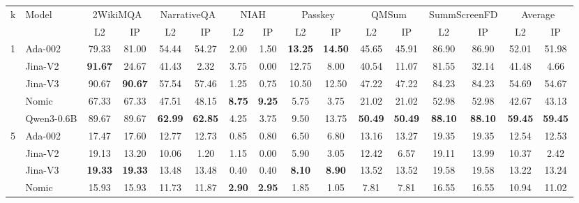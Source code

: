 \begin{sidewaystable}[htbp!]
\centering
\footnotesize
{}
\label{tab:detailed_precision}
\begin{tabular}{llcccccccccccccc}
\toprule
\multirow{2}{*}{k} & \multirow{2}{*}{Model} & \multicolumn{2}{c}{2WikiMQA} & \multicolumn{2}{c}{NarrativeQA} & \multicolumn{2}{c}{NIAH} & \multicolumn{2}{c}{Passkey} & \multicolumn{2}{c}{QMSum} & \multicolumn{2}{c}{SummScreenFD} & \multicolumn{2}{c}{Average} \\
\cmidrule(lr){3-4} \cmidrule(lr){5-6} \cmidrule(lr){7-8} \cmidrule(lr){9-10} \cmidrule(lr){11-12} \cmidrule(lr){13-14} \cmidrule(lr){15-16}
& & L2 & IP & L2 & IP & L2 & IP & L2 & IP & L2 & IP & L2 & IP & L2 & IP \\
\midrule
\multirow{5}{*}{1} & Ada-002 & 79.33 & 81.00 & 54.44 & 54.27 & 2.00 & 1.50 & \textbf{13.25} & \textbf{14.50} & 45.65 & 45.91 & 86.90 & 86.90 & 52.01 & 51.98 \\
& Jina-V2 & \textbf{91.67} & 24.67 & 41.43 & 2.32 & 3.75 & 0.00 & 12.75 & 8.00 & 40.54 & 11.07 & 81.55 & 32.14 & 41.48 & 4.66 \\
& Jina-V3 & 90.67 & \textbf{90.67} & 57.54 & 57.46 & 1.25 & 0.75 & 10.50 & 12.50 & 47.22 & 47.22 & 84.23 & 84.23 & 54.69 & 54.67 \\
& Nomic & 67.33 & 67.33 & 47.51 & 48.15 & \textbf{8.75} & \textbf{9.25} & 5.75 & 3.75 & 21.02 & 21.02 & 52.98 & 52.98 & 42.67 & 43.13 \\
& Qwen3-0.6B & 89.67 & 89.67 & \textbf{62.99} & \textbf{62.85} & 4.25 & 3.75 & 9.50 & 13.75 & \textbf{50.49} & \textbf{50.49} & \textbf{88.10} & \textbf{88.10} & \textbf{59.45} & \textbf{59.45} \\
\midrule
\multirow{5}{*}{5} & Ada-002 & 17.47 & 17.60 & 12.77 & 12.73 & 0.85 & 0.80 & 6.50 & 6.80 & 13.16 & 13.27 & 19.35 & 19.35 & 12.54 & 12.53 \\
& Jina-V2 & 19.13 & 13.20 & 10.06 & 1.20 & 1.15 & 0.00 & 5.90 & 3.05 & 12.42 & 6.57 & 19.11 & 13.99 & 10.37 & 2.42 \\
& Jina-V3 & \textbf{19.33} & \textbf{19.33} & 13.48 & 13.48 & 0.40 & 0.40 & \textbf{8.10} & \textbf{8.90} & 13.52 & 13.52 & 19.58 & 19.58 & 13.22 & 13.24 \\
& Nomic & 15.93 & 15.93 & 11.73 & 11.87 & \textbf{2.90} & \textbf{2.95} & 1.85 & 1.05 & 7.81 & 7.81 & 16.55 & 16.55 & 10.94 & 11.02 \\

\end{tabular}
\end{sidewaystable}
